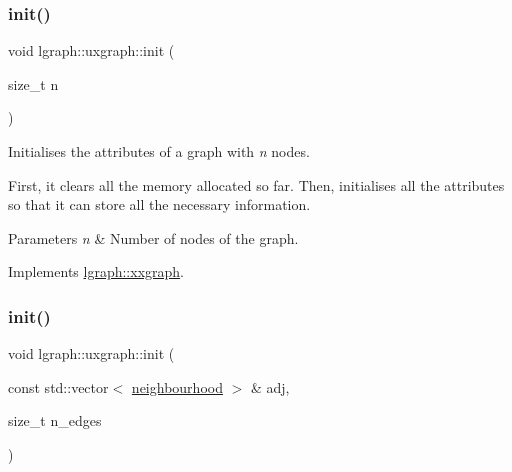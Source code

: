\mbox{\label{classlgraph_1_1uxgraph_a539e735d68b55ce01d733262c9db34d5}} 
\subsubsection{\texorpdfstring{init()}{init()}\hspace{0.1cm}{\footnotesize\ttfamily [1/2]}}
{\footnotesize\ttfamily void lgraph\+::uxgraph\+::init (\begin{DoxyParamCaption}\item[{size\+\_\+t}]{n }\end{DoxyParamCaption})\hspace{0.3cm}{\ttfamily [virtual]}}



Initialises the attributes of a graph with {\itshape n} nodes. 

First, it clears all the memory allocated so far. Then, initialises all the attributes so that it can store all the necessary information.


\begin{DoxyParams}{Parameters}
{\em n} & Number of nodes of the graph. \\
\hline
\end{DoxyParams}


Implements \hyperlink{classlgraph_1_1xxgraph_aba97900b2d33e1bb0d31594cf169f0ba}{lgraph\+::xxgraph}.

\mbox{\label{classlgraph_1_1uxgraph_ab0e84975aa8048e6d93622d1b4e0c567}} 
\subsubsection{\texorpdfstring{init()}{init()}\hspace{0.1cm}{\footnotesize\ttfamily [2/2]}}
{\footnotesize\ttfamily void lgraph\+::uxgraph\+::init (\begin{DoxyParamCaption}\item[{const std\+::vector$<$ \hyperlink{namespacelgraph_a052e7766c13f3a43cec0aec8173fdede}{neighbourhood} $>$ \&}]{adj,  }\item[{size\+\_\+t}]{n\+\_\+edges }\end{DoxyParamCaption})}



